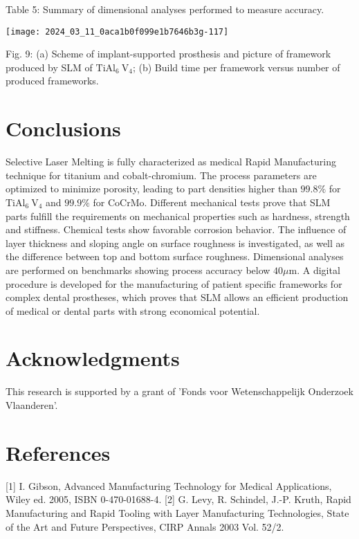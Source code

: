 \documentclass[10pt]{article}
\begin{document}
Table 5: Summary of dimensional analyses performed to measure accuracy.

\begin{center}
\texttt{[image: 2024\_03\_11\_0aca1b0f099e1b7646b3g-117]}
\end{center}

Fig. 9: (a) Scheme of implant-supported prosthesis and picture of framework produced by SLM of $\mathrm{TiAl}_{6} \mathrm{~V}_{4}$; (b) Build time per framework versus number of produced frameworks.

\section*{Conclusions}
Selective Laser Melting is fully characterized as medical Rapid Manufacturing technique for titanium and cobalt-chromium. The process parameters are optimized to minimize porosity, leading to part densities higher than $99.8 \%$ for $\mathrm{TiAl}_{6} \mathrm{~V}_{4}$ and $99.9 \%$ for CoCrMo. Different mechanical tests prove that SLM parts fulfill the requirements on mechanical properties such as hardness, strength and stiffness. Chemical tests show favorable corrosion behavior. The influence of layer thickness and sloping angle on surface roughness is investigated, as well as the difference between top and bottom surface roughness. Dimensional analyses are performed on benchmarks showing process accuracy below $40 \mu \mathrm{m}$. A digital procedure is developed for the manufacturing of patient specific frameworks for complex dental prostheses, which proves that SLM allows an efficient production of medical or dental parts with strong economical potential.

\section*{Acknowledgments}
This research is supported by a grant of 'Fonds voor Wetenschappelijk Onderzoek Vlaanderen'.

\section*{References}
[1] I. Gibson, Advanced Manufacturing Technology for Medical Applications, Wiley ed. 2005, ISBN 0-470-01688-4. [2] G. Levy, R. Schindel, J.-P. Kruth, Rapid Manufacturing and Rapid Tooling with Layer Manufacturing Technologies, State of the Art and Future Perspectives, CIRP Annals 2003 Vol. 52/2.
\end{document}
